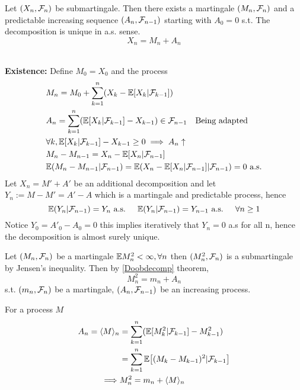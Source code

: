 \begin{thm}
\label{Doobdecomp}
Let $(X_n, \mathcal{F}_n)$ be submartingale. Then there exists a martingale $(M_n, \mathcal{F}_n)$ and a predictable increasing sequence $(A_n, \mathcal{F}_{n-1})$ starting with $A_0 = 0$ s.t. The decomposition is unique in a.s. sense.
\begin{equation*}
    X_n = M_n + A_n
\end{equation*}
\end{thm}
\pf \\
\textbf{Existence:} Define $M_0 = X_0$ and the process
\begin{align*}
    &M_n = M_0 + \sum\limits_{k=1}^n(X_k - \mathbb{E}[X_k|\mathcal{F}_{k-1}]) \\
    &A_n = \sum\limits_{k=1}^n(\mathbb{E}[X_k|\mathcal{F}_{k-1}]- X_{k-1}) \in \mathcal{F}_{n-1} \quad \text{Being adapted} \\
    &\forall k, \mathbb{E}[X_k|\mathcal{F}_{k-1}]- X_{k-1} \geq 0 \implies A_n\uparrow \\
    &M_{n} - M_{n-1} = X_n - \mathbb{E}[X_n|\mathcal{F}_{n-1}] \\
    &\mathbb{E}(M_{n} - M_{n-1}|\mathcal{F}_{n-1}) = \mathbb{E}(X_n - \mathbb{E}[X_n|\mathcal{F}_{n-1}]|\mathcal{F}_{n-1}) = 0 \text{ a.s.} \\
\end{align*}
Let $X_n = M'+A' $ be an additional decomposition and let $Y_n:= M-M' = A' - A$ which is a martingale and predictable process, hence \begin{equation*}
    \mathbb{E}(Y_n |\mathcal{F}_{n-1}) = Y_n \text{ a.s. } \quad \mathbb{E}(Y_n |\mathcal{F}_{n-1}) = Y_{n-1} \text{ a.s. } \quad \forall n\geq 1
\end{equation*}Notice $Y_0 = A'_0 - A_0 = 0$ this implies iteratively that $Y_n = 0$ a.s for all n, hence the decomposition is almost surely unique.

\newpage
Let $(M_n, \mathcal{F}_n)$ be a martingale $\mathbb{E} M_n^2 <\infty ,\forall n$ then $(M_n^2, \mathcal{F}_n)$ is a submartingale by Jensen's inequality. Then by \ref{Doobdecomp} theorem, 
\begin{equation*}
    M_n^2 = m_n + A_n
\end{equation*}s.t. $(m_n, \mathcal{F}_n)$ be a martingale, $(A_n, \mathcal{F}_{n-1})$ be an increasing process.

\begin{dfn} For a process $M$ \begin{align*}
    A_n = \langle{M} \rangle_n  &= \sum\limits_{k=1}^n(\mathbb{E}[M_k^2|\mathcal{F}_{k-1}]- M_{k-1}^2) \\
    &= \sum\limits_{k=1}^n \mathbb{E}\big[(M_k - M_{k-1})^2| \mathcal{F}_{k-1}\big] \\
    \implies& M_n^2 = m_n + \langle{M} \rangle_n
\end{align*}
\end{dfn}

